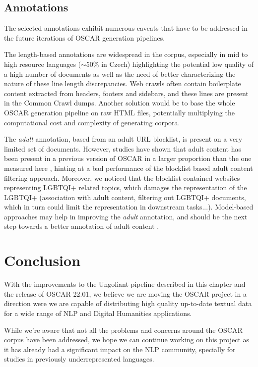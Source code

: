 \subsection{Annotations}

The selected annotations exhibit numerous caveats that have to be addressed in the future iterations of OSCAR generation pipelines.

The length-based annotations are widespread in the corpus, especially in mid to high resource languages ($\sim50\%$ in Czech) highlighting the potential low quality of a high number of documents as well as the need of better characterizing the nature of these line length discrepancies. Web crawls often contain boilerplate content extracted from headers, footers and sidebars, and these lines are present in the Common Crawl dumps.
Another solution would be to base the whole OSCAR generation pipeline on raw HTML files, potentially multiplying the computational cost and complexity of generating corpora.

The \textit{adult} annotation, based from an adult URL blocklist, is present on a very limited set of documents. However, studies have shown that adult content has been present in a previous version of OSCAR in a larger proportion than the one measured here \cite{kreutzer-etal-2021-quality}, hinting at a bad performance of the blocklist based adult content filtering approach. Moreover, we noticed that the blocklist contained websites representing LGBTQI+ related topics, which damages the representation of the LGBTQI+ (association with adult content, filtering out LGBTQI+ documents, which in turn could limit the representation in downstream tasks...).
Model-based approaches may help in improving the \textit{adult} annotation, and should be the next step towards a better annotation of adult content \cite{luccioni-viviano-2021-whats}.


\section{Conclusion}

With the improvements to the Ungoliant pipeline described in this chapter and the release of OSCAR 22.01, we believe we are moving the OSCAR project in a direction were we are capable of distributing high quality up-to-date textual data for a wide range of NLP and Digital Humanities applications.

While we're aware that not all the problems and concerns around the OSCAR corpus have been addressed, we hope we can continue working on this project as it has already had a significant impact on the NLP community, specially for studies in previously underrepresented languages.


